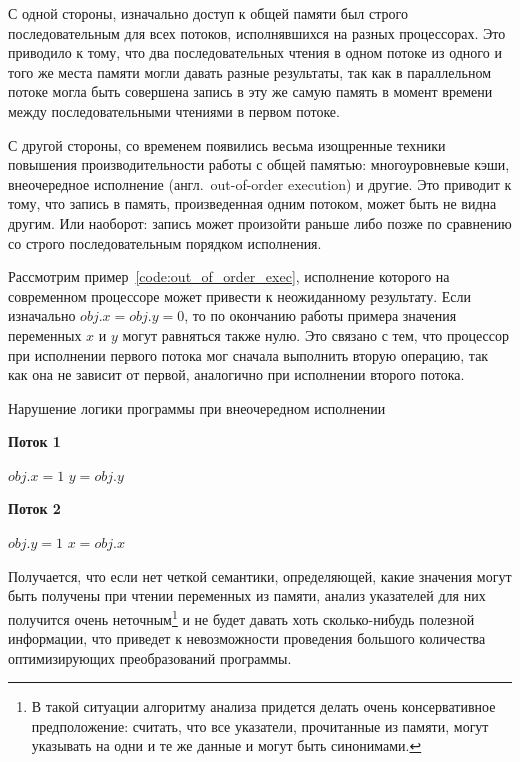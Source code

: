 \documentclass[14pt,titlepage]{extarticle}
\newcommand{\algorithmictitle}[1]{\hspace{8mm}\textbf{#1}}
\newcommand{\eng}[1]{{\English#1}}
\newcommand{\engdef}[1]{(англ.~\eng{#1})}
\begin{document}
      С одной стороны, изначально доступ к общей памяти был строго
      последовательным для всех потоков, исполнявшихся на разных процессорах.
      Это приводило к тому, что два последовательных чтения в одном потоке из
      одного и того же места памяти могли давать разные результаты, так как в
      параллельном потоке могла быть совершена запись в эту же самую память в
      момент времени между последовательными чтениями в первом потоке.

      С другой стороны, со временем появились весьма изощренные техники
      повышения производительности работы с общей памятью: многоуровневые кэши,
      внеочередное исполнение \engdef{out-of-order execution} и другие.
      Это приводит к тому, что запись в память, произведенная одним потоком,
      может быть не видна другим. Или наоборот: запись может произойти раньше
      либо позже по сравнению со строго последовательным порядком исполнения.

      Рассмотрим пример~\ref{code:out_of_order_exec}, исполнение которого на
      современном процессоре может привести к неожиданному результату.
      Если изначально $obj.x = obj.y = 0$, то по окончанию работы примера
      значения переменных $x$ и $y$ могут равняться также нулю. Это связано с
      тем, что процессор при исполнении первого потока мог сначала выполнить
      вторую операцию, так как она не зависит от первой, аналогично при
      исполнении второго потока.

      \begin{algorithm}
        \caption{Нарушение логики программы при внеочередном исполнении}
        \label{code:out_of_order_exec}
        \begin{multicols}{2}
          \algorithmictitle{Поток 1}
          \begin{algorithmic}[1]
            \STATE $obj.x = 1$
            \STATE $y = obj.y$
          \end{algorithmic}
          \columnbreak
          \algorithmictitle{Поток 2}
          \begin{algorithmic}[1]
            \STATE $obj.y = 1$
            \STATE $x = obj.x$
          \end{algorithmic}
        \end{multicols}
      \end{algorithm}

      Получается, что если нет четкой семантики, определяющей, какие значения
      могут быть получены при чтении переменных из памяти, анализ указателей
      для них получится очень неточным\footnote{
        В такой ситуации алгоритму анализа придется делать очень консервативное
        предположение: считать, что все указатели, прочитанные из памяти, могут
        указывать на одни и те же данные и могут быть синонимами.
      } и не будет давать хоть сколько-нибудь полезной информации, что приведет
      к невозможности проведения большого количества оптимизирующих
      преобразований программы.
\end{document}
